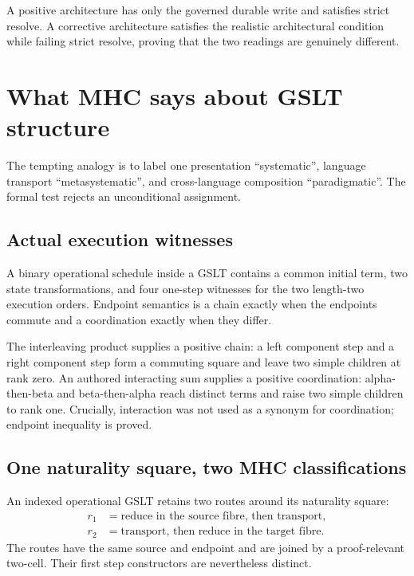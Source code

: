 \documentclass[11pt]{article}
\theoremstyle{remark}
\begin{document}
A positive architecture has only the governed durable write and satisfies
strict resolve.  A corrective architecture satisfies the realistic
architectural condition while failing strict resolve, proving that the two
readings are genuinely different.

\section{What MHC says about GSLT structure}

The tempting analogy is to label one presentation ``systematic'', language
transport ``metasystematic'', and cross-language composition ``paradigmatic''.
The formal test rejects an unconditional assignment.

\subsection{Actual execution witnesses}

A binary operational schedule inside a GSLT contains a common initial term,
two state transformations, and four one-step witnesses for the two length-two
execution orders.  Endpoint semantics is a chain exactly when the endpoints
commute and a coordination exactly when they differ.

The interleaving product supplies a positive chain: a left component step and a
right component step form a commuting square and leave two simple children at
rank zero.  An authored interacting sum supplies a positive coordination:
alpha-then-beta and beta-then-alpha reach distinct terms and raise two simple
children to rank one.  Crucially, interaction was not used as a synonym for
coordination; endpoint inequality is proved.

\subsection{One naturality square, two MHC classifications}

An indexed operational GSLT retains two routes around its naturality square:
\[
\begin{aligned}
  r_1 &= \text{reduce in the source fibre, then transport},\\
  r_2 &= \text{transport, then reduce in the target fibre}.
\end{aligned}
\]
The routes have the same source and endpoint and are joined by a proof-relevant
two-cell.  Their first step constructors are nevertheless distinct.
\end{document}
